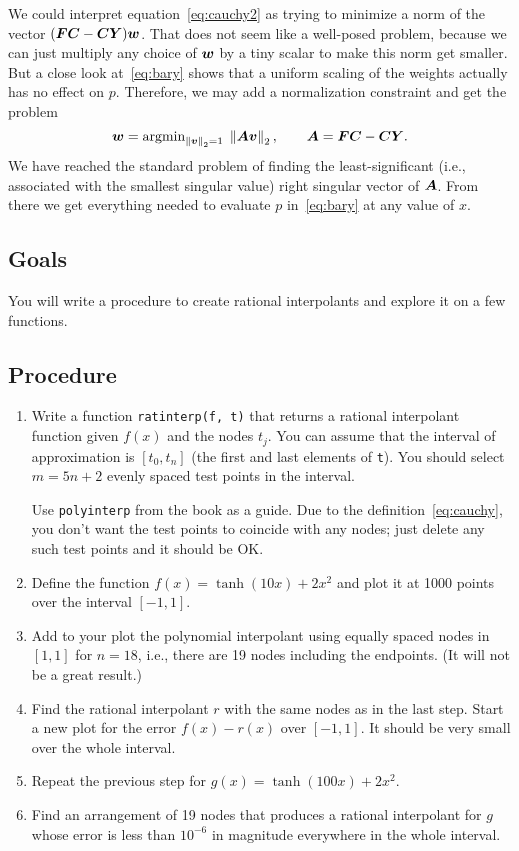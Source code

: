 \documentclass[11pt,twoside]{article}
\newcommand{\norm}[1]{\left \lVert #1 \right \rVert}
\begin{document}
We could interpret equation~\eqref{eq:cauchy2} as trying to minimize a norm of the vector $(\bm{F}\bm{C} - \bm{C} \bm{Y})  \bm{w}$. That does not seem like a well-posed problem, because we can just multiply any choice of $\bm{w}$ by a tiny scalar to make this norm get smaller. But a close look at~\eqref{eq:bary} shows that a uniform scaling of the weights actually has no effect on $p$. Therefore, we may add a normalization constraint and get the problem
\begin{equation}
  \label{eq:min}
  \bfw = \operatorname{argmin}_{\norm{\bfv}_2 = 1} \; \norm{\m{A}  \bfv}_2, \qquad \m{A} = \m{F}\m{C} - \m{C} \m{Y}.
\end{equation}
We have reached the standard problem of finding the least-significant (i.e., associated with the smallest singular value) right singular vector of $\bm{A}$. From there we get everything needed to evaluate $p$ in~\eqref{eq:bary} at any value of $x$.


\subsection*{Goals}

You will write a procedure to create rational interpolants and explore it on a few functions.  

\subsection*{Procedure}

\begin{enumerate}
    \item Write a function \texttt{ratinterp(f, t)} that returns a rational interpolant function given $f(x)$ and the nodes $t_j$. You can assume that the interval of approximation is $[t_0, t_n]$ (the first and last elements of \texttt{t}). You should select $m = 5n+2$ evenly spaced test points in the interval. 
    
    Use \texttt{polyinterp} from the book as a guide. Due to the definition~\eqref{eq:cauchy}, you don't want the test points to coincide with any nodes; just delete any such test points and it should be OK. 
    \item Define the function $f(x) = \tanh(10x) + 2x^2$ and plot it at 1000 points over the interval $[-1,1]$.
    \item Add to your plot the polynomial interpolant using equally spaced nodes in $[1,1]$ for $n=18$, i.e., there are 19 nodes including the endpoints. (It will not be a great result.)
    \item Find the rational interpolant $r$ with the same nodes as in the last step. Start a new plot for the error $f(x)-r(x)$ over $[-1,1]$. It should be very small over the whole interval.
    \item Repeat the previous step for $g(x) = \tanh(100x) + 2x^2$.
    \item Find an arrangement of 19 nodes that produces a rational interpolant for $g$ whose error is less than $10^{-6}$ in magnitude everywhere in the whole interval.
\end{enumerate}
\end{document}
